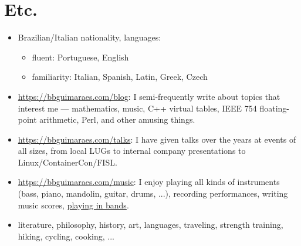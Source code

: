 \section*{Etc.}

\begin{itemize}
    \item Brazilian\slash Italian nationality, languages:
        \begin{itemize}
            \item fluent: Portuguese, English
            \item familiarity: Italian, Spanish, Latin, Greek, Czech
        \end{itemize}
    \item
        \url{https://bbguimaraes.com/blog}: I semi-frequently write about topics
        that interest me --- mathematics, music, C++ virtual tables, IEEE 754
        floating-point arithmetic, Perl, and other amusing things.
    \item
        \url{https://bbguimaraes.com/talks}: I have given talks over the years
        at events of all sizes, from local LUGs to internal company
        presentations to Linux\slash ContainerCon\slash FISL.
    \item
        \url{https://bbguimaraes.com/music}: I enjoy playing all kinds of
        instruments (bass, piano, mandolin, guitar, drums, ...), recording
        performances, writing music scores,
        \href{https://www.youtube.com/larajackpot}{playing in bands}.
    \item
        literature, philosophy, history, art, languages, traveling, strength
        training, hiking, cycling, cooking, ...
\end{itemize}
